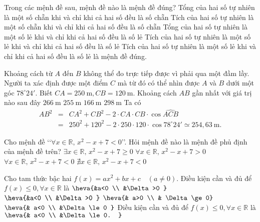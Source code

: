 \begin{ex}%
    Trong các mệnh đề sau, mệnh đề nào là mệnh đề đúng?
    \choice
    {Tổng của hai số tự nhiên là một số chẵn khi và chỉ khi cả hai số đều là số chẵn}
    {Tích của hai số tự nhiên là một số chẵn khi và chỉ khi cả hai số đều là số chẵn}
    {Tổng của hai số tự nhiên là một số lẻ khi và chỉ khi cả hai số đều là số lẻ}
    {\True Tích của hai số tự nhiên là một số lẻ khi và chỉ khi cả hai số đều là số lẻ} 
    \loigiai
    {
        Tích của hai số tự nhiên là một số lẻ khi và chỉ khi cả hai số đều là số lẻ là mệnh đề đúng.
    }
\end{ex}
\begin{ex}%
    Khoảng cách từ $A$ đến $B$ không thể đo trực tiếp được vì phải qua một đầm lầy. Người ta xác định được một điểm $C$ mà từ đó có thể nhìn được $A$ và $B$ dưới một góc $78^{\circ} 24'$. Biết $C A=250 \mathrm{~m}, CB=120 \mathrm{~m}$. Khoảng cách $A B$ gần nhất với giá trị nào sau đây
    \choice
    {$266 \mathrm{~m}$}
    {\True $255 \mathrm{~m}$}
    {$166 \mathrm{~m}$}
    {$298 \mathrm{~m}$} 
    \loigiai
    {
        Ta có \begin{eqnarray*}
            AB^2&=&CA^2+CB^2-2\cdot CA\cdot CB\cdot \cos\widehat{ACB}\\
            &=&250^2+120^2-2\cdot 250\cdot 120\cdot \cos 78^\circ24'\simeq 254{,}63 ~\mathrm{m}.
        \end{eqnarray*}
    }
\end{ex}
\begin{ex}%
    Cho mệnh đề \lq\lq$\forall x\in \mathbb{R},\, x^2-x+7<0$\rq\rq. Hỏi mệnh đề nào là mệnh đề phủ định của mệnh đề trên? 
    \choice
    {\True $\exists x\in \mathbb{R}, \, x^2-x+7\geq 0$}
    {$\forall x\in \mathbb{R},\, x^2-x+7>0$}
    {$\forall x\in \mathbb{R},\, x^2-x+7<0$}
    {$\nexists x\in \mathbb{R},\, x^2-x+7<0$}
\end{ex}
\begin{ex}%
    Cho tam thức bậc hai $f(x)=a x^2+b x+c \quad(a \neq 0)$. Điều kiện cần và đủ để\\ $f(x) \leq 0, \forall x \in \mathbb{R}$ là
    \choice
    {$\heva{&a<0  \\ &\Delta>0 }$}
    {$\heva{&a<0  \\ &\Delta>0 }$}
    {$\heva{& a>0 \\ & \Delta\ge 0}$}
    {\True $\heva{& a<0 \\ &\Delta\le 0 }$}
    \loigiai
    {
      Điều kiện cần và đủ để $f(x) \leq 0, \forall x \in \mathbb{R}$ là  $\heva{& a<0 \\ &\Delta\le 0. }$
    }
\end{ex}
